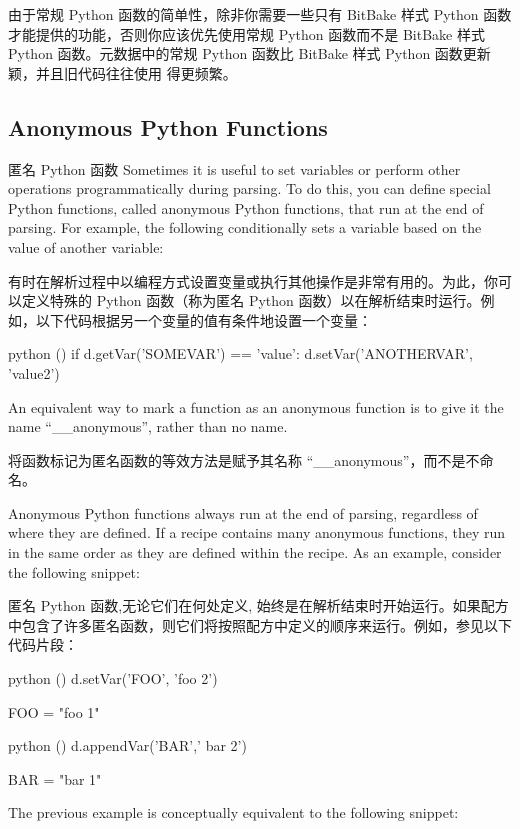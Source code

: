 由于常规 Python 函数的简单性，除非你需要一些只有 BitBake 样式 Python 函数才能提供的功能，否则你应该优先使用常规 Python 函数而不是 BitBake 样式 Python 函数。元数据中的常规 Python 函数比 BitBake 样式 Python 函数更新颖，并且旧代码往往使用  得更频繁。

\subsection{Anonymous Python Functions}{匿名 Python 函数}
\label{section:Anonymous Python Functions}
Sometimes it is useful to set variables or perform other operations programmatically during parsing. To do this, you can define special Python functions, called anonymous Python functions, that run at the end of parsing. For example, the following conditionally sets a variable based on the value of another variable:

有时在解析过程中以编程方式设置变量或执行其他操作是非常有用的。为此，你可以定义特殊的 Python 函数（称为匿名 Python 函数）以在解析结束时运行。例如，以下代码根据另一个变量的值有条件地设置一个变量：

\begin{pyglist}
python () {
    if d.getVar('SOMEVAR') == 'value':
        d.setVar('ANOTHERVAR', 'value2')
}
\end{pyglist}

An equivalent way to mark a function as an anonymous function is to give it the name ``\_\_anonymous'', rather than no name.

将函数标记为匿名函数的等效方法是赋予其名称 ``\_\_anonymous''，而不是不命名。

Anonymous Python functions always run at the end of parsing, regardless of where they are defined. If a recipe contains many anonymous functions, they run in the same order as they are defined within the recipe. As an example, consider the following snippet:

匿名 Python 函数,无论它们在何处定义, 始终是在解析结束时开始运行。如果配方中包含了许多匿名函数，则它们将按照配方中定义的顺序来运行。例如，参见以下代码片段：

\begin{pyglist}
python () {
    d.setVar('FOO', 'foo 2')
}

FOO = "foo 1"

python () {
    d.appendVar('BAR',' bar 2')
}

BAR = "bar 1"
\end{pyglist}

The previous example is conceptually equivalent to the following snippet:


